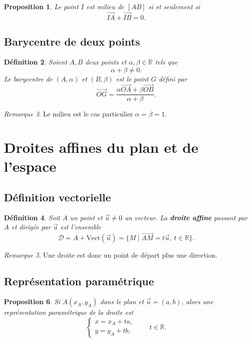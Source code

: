 \documentclass[11pt,a4paper]{article}
\newtheorem{definition}{Définition}[section]
\newtheorem{proposition}[definition]{Proposition}
\theoremstyle{remark}
\newtheorem{remarque}[definition]{Remarque}
\newcommand{\R}{\mathbb{R}}
\newcommand{\Vect}{\mathrm{Vect}}
\begin{document}
\begin{proposition}
Le point \(I\) est milieu de \([AB]\) si et seulement si
\[
\overrightarrow{IA}+\overrightarrow{IB}=0.
\]
\end{proposition}

\subsection{Barycentre de deux points}

\begin{definition}
Soient \(A,B\) deux points et \(\alpha,\beta\in\R\) tels que
\[
\alpha+\beta\neq 0.
\]
Le barycentre de \((A,\alpha)\) et \((B,\beta)\) est le point \(G\) défini par
\[
\overrightarrow{OG}=\frac{\alpha\overrightarrow{OA}+\beta\overrightarrow{OB}}{\alpha+\beta}.
\]
\end{definition}

\begin{remarque}
Le milieu est le cas particulier \(\alpha=\beta=1\).
\end{remarque}

\section{Droites affines du plan et de l’espace}

\subsection{Définition vectorielle}

\begin{definition}
Soit \(A\) un point et \(\vec{u}\neq 0\) un vecteur.  
La \textbf{droite affine} passant par \(A\) et dirigée par \(\vec{u}\) est l’ensemble
\[
\mathcal D=A+\Vect(\vec{u})
=
\{M\mid \overrightarrow{AM}=t\vec{u},\ t\in\R\}.
\]
\end{definition}

\begin{remarque}
Une droite est donc un point de départ plus une direction.
\end{remarque}

\subsection{Représentation paramétrique}

\begin{proposition}
Si \(A(x_A,y_A)\) dans le plan et \(\vec{u}=(a,b)\), alors une représentation paramétrique de la droite est
\[
\begin{cases}
x=x_A+ta,\\
y=y_A+tb,
\end{cases}
\qquad t\in\R.
\]
\end{proposition}
\end{document}
